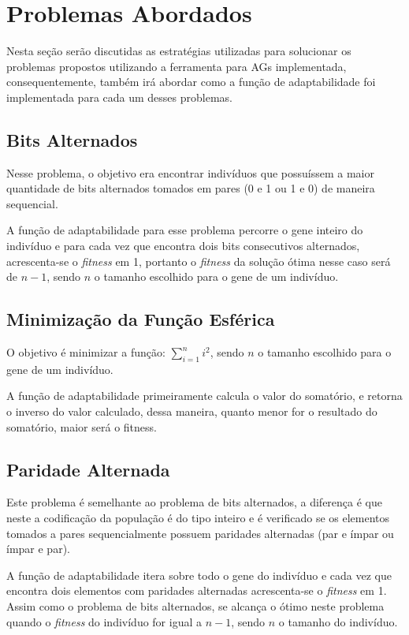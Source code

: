 \documentclass[12pt]{article}
\begin{document}
\section{Problemas Abordados}

Nesta seção serão discutidas as estratégias utilizadas para solucionar os problemas propostos utilizando 
a ferramenta para AGs implementada, consequentemente, também irá abordar como a função de adaptabilidade 
foi implementada para cada um desses problemas.

\subsection{Bits Alternados}

Nesse problema, o objetivo era encontrar indivíduos que possuíssem a maior quantidade de bits alternados 
tomados em pares (0 e 1 ou 1 e 0) de maneira sequencial. 

A função de adaptabilidade para esse problema percorre o gene inteiro do indivíduo e para cada vez que encontra 
dois bits consecutivos alternados, acrescenta-se o \textit{fitness} em 1, portanto o \textit{fitness} da solução ótima nesse 
caso será de $n - 1$, sendo $n$ o tamanho escolhido para o gene de um indivíduo.

\subsection{Minimização da Função Esférica}

O objetivo é minimizar a função: $\sum^{n}_{i=1} i ^ 2$, sendo $n$ o tamanho escolhido para o gene de um indivíduo.

A função de adaptabilidade primeiramente calcula o valor do somatório, e retorna o inverso do valor calculado, dessa 
maneira, quanto menor for o resultado do somatório, maior será o fitness.

\subsection{Paridade Alternada}

Este problema é semelhante ao problema de bits alternados, a diferença é que neste a codificação da população 
é do tipo inteiro e é verificado se os elementos tomados a pares sequencialmente possuem paridades alternadas 
(par e ímpar ou ímpar e par).

A função de adaptabilidade itera sobre todo o gene do indivíduo e cada vez que encontra dois elementos com 
paridades alternadas acrescenta-se o \textit{fitness} em 1. Assim como o problema de bits alternados, 
se alcança o ótimo neste problema quando o \textit{fitness} do indivíduo for igual a $n - 1$, sendo $n$
o tamanho do indivíduo.
\end{document}
